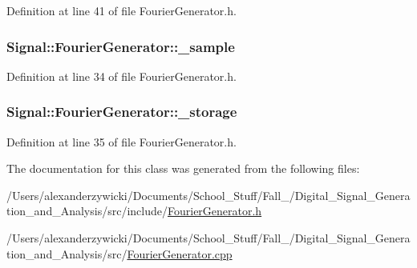 Definition at line 41 of file Fourier\+Generator.\+h.

\hypertarget{classSignal_1_1FourierGenerator_a78c37a66bf33a2fda3c9e92478ad418c}{
\subsubsection[{\+\_\+sample}]{ Signal\+::\+Fourier\+Generator\+::\+\_\+sample\hspace{0.3cm}{\ttfamily [protected]}}}\label{classSignal_1_1FourierGenerator_a78c37a66bf33a2fda3c9e92478ad418c}


Definition at line 34 of file Fourier\+Generator.\+h.

\hypertarget{classSignal_1_1FourierGenerator_af7ad42ccb202fba6c0fb1ec653c5cb36}{
\subsubsection[{\+\_\+storage}]{ Signal\+::\+Fourier\+Generator\+::\+\_\+storage\hspace{0.3cm}{\ttfamily [protected]}}}\label{classSignal_1_1FourierGenerator_af7ad42ccb202fba6c0fb1ec653c5cb36}


Definition at line 35 of file Fourier\+Generator.\+h.



The documentation for this class was generated from the following files\+:\begin{DoxyCompactItemize}
\item 
/\+Users/alexanderzywicki/\+Documents/\+School\+\_\+\+Stuff/\+Fall\+\_/\+Digital\+\_\+\+Signal\+\_\+\+Generation\+\_\+and\+\_\+\+Analysis/src/include/\hyperlink{FourierGenerator_8h}{Fourier\+Generator.\+h}\item 
/\+Users/alexanderzywicki/\+Documents/\+School\+\_\+\+Stuff/\+Fall\+\_/\+Digital\+\_\+\+Signal\+\_\+\+Generation\+\_\+and\+\_\+\+Analysis/src/\hyperlink{FourierGenerator_8cpp}{Fourier\+Generator.\+cpp}\end{DoxyCompactItemize}
